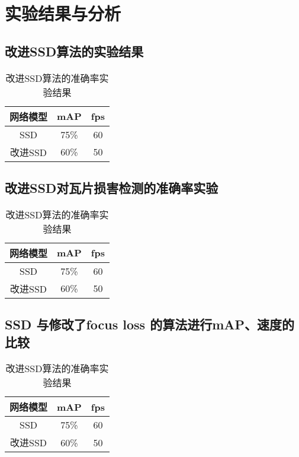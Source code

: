 \section{实验结果与分析}
\setcounter{figure}{0}

\subsection{改进SSD算法的实验结果}
\begin{table}[htbp]
	\centering
	\caption{改进SSD算法的准确率实验结果}
	\label{}
	\begin{tabular}{ccc}
		\toprule
		网络模型 & mAP & fps\\
		\midrule
		SSD 	& 75\% & 60\\
		改进SSD  &  60\% & 50\\
		\bottomrule
	\end{tabular}
\end{table}
\subsection{改进SSD对瓦片损害检测的准确率实验}
\begin{table}[htbp]
	\centering
	\caption{改进SSD算法的准确率实验结果}
	\label{}
	\begin{tabular}{ccc}
		\toprule
		网络模型 & mAP & fps\\
		\midrule
		SSD 	& 75\% & 60\\
		改进SSD  &  60\% & 50\\
		\bottomrule
	\end{tabular}
\end{table}
\subsection{SSD 与修改了focus loss 的算法进行mAP、速度的比较}
\begin{table}[htbp]
	\centering
	\caption{改进SSD算法的准确率实验结果}
	\label{}
	\begin{tabular}{ccc}
		\toprule
		网络模型 & mAP & fps\\
		\midrule
		SSD 	& 75\% & 60\\
		改进SSD  &  60\% & 50\\
		\bottomrule
	\end{tabular}
\end{table}


